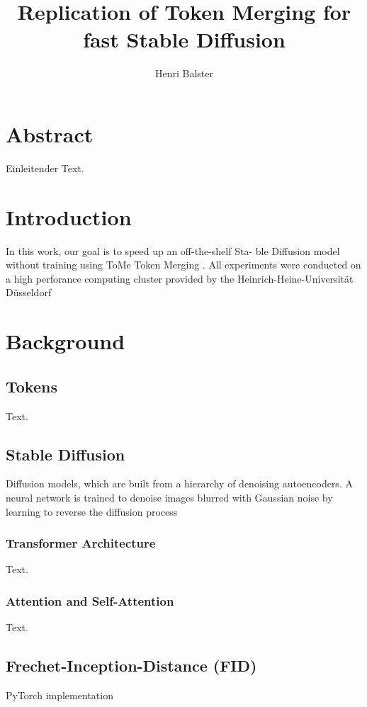 \documentclass{article}
\title{{\myfont Replication of Token Merging for fast Stable Diffusion}}
\author{Henri Balster}
\date{}
\begin{document}
\maketitle

\tableofcontents

\newpage
\section*{Abstract}
Einleitender Text.





\newpage
\section{Introduction}
In this work, our goal is to speed up an off-the-shelf Sta-
ble Diffusion model without training using ToMe
Token Merging \cite{bolya2023tomesd}.
All experiments were conducted on a high perforance computing cluster provided by the Heinrich-Heine-Universität Düsseldorf





\newpage
\section{Background}
\subsection{Tokens}
Text.

\subsection{Stable Diffusion}
Diffusion models, which are built from a hierarchy of
denoising autoencoders. A neural network is trained to denoise images blurred with Gaussian noise by learning to reverse the diffusion process

\subsubsection{Transformer Architecture}
Text.

\subsubsection{Attention and Self-Attention}
Text.

\subsection{Frechet-Inception-Distance (FID)}
PyTorch implementation \cite{Seitzer2020FID}
\end{document}
